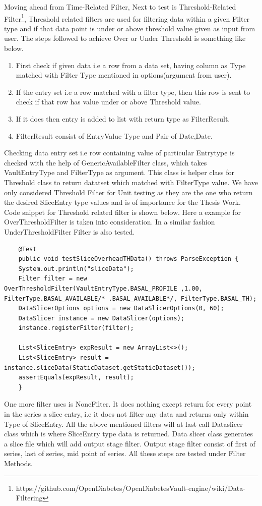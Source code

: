 \documentclass[article,type=msc,colorback,accentcolor=tud9c,twoside,11pt]{tudthesis}
\begin{document}
	Moving ahead from Time-Related Filter, Next to test is Threshold-Related Filter\footnote{https://github.com/OpenDiabetes/OpenDiabetesVault-engine/wiki/Data-Filtering}, Threshold related filters are used for filtering data within a given Filter type and if that data point is under or above threshold value given as input from user. The steps followed to achieve Over or Under Threshold is something like below.
	\begin{enumerate}
		\item First check if given data i.e a row from a data set, having column as Type matched with Filter Type mentioned in options(argument from user).
		\item If the entry set i.e a row matched with a filter type, then this row is sent to check if that row has value under or above Threshold value.
		\item If it does then entry is added to list with return type as FilterResult.
		\item FilterResult consist of EntryValue Type and Pair of Date,Date.
	\end{enumerate}
	Checking data entry set i.e row containing value of particular Entrytype is checked with the help of  GenericAvailableFilter class, which takes VaultEntryType and FilterType as argument. This class is helper class for Threshold class to return datatset which  matched with FilterType value. We have only considered Threshold Filter for Unit testing as they are the one who return the desired SliceEntry type values and is of importance for the Thesis Work. Code snippet for Threshold related filter is shown below. Here a example for OverThresholdFilter is taken into consideration. In a similar fashion UnderThresholdFilter Filter is also tested.
	\begin{lstlisting}
	@Test
	public void testSliceOverheadTHData() throws ParseException {
	System.out.println("sliceData");     
	Filter filter = new OverThresholdFilter(VaultEntryType.BASAL_PROFILE ,1.00, FilterType.BASAL_AVAILABLE/* .BASAL_AVAILABLE*/, FilterType.BASAL_TH);
	DataSlicerOptions options = new DataSlicerOptions(0, 60);
	DataSlicer instance = new DataSlicer(options);
	instance.registerFilter(filter);
	
	List<SliceEntry> expResult = new ArrayList<>();
	List<SliceEntry> result = instance.sliceData(StaticDataset.getStaticDataset());
	assertEquals(expResult, result);
	}
	\end{lstlisting}
	One more filter uses is NoneFilter. It does nothing except return for every point in the series a slice entry, i.e it does not filter any data and returns only within Type of SliceEntry. All the above mentioned filters will at last call Dataslicer class which is where SliceEntry type data is returned. Data slicer class generates a slice file  which will add output stage filter. Output stage filter consist of first of series, last of series, mid point of series. All these steps are tested under Filter Methods.
	
\end{document}
